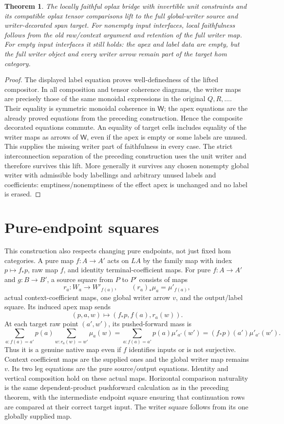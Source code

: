 \documentclass[11pt]{article}
\newtheorem{theorem}{Theorem}\newtheorem{proposition}[theorem]{Proposition}
\begin{document}
\begin{theorem}
The locally faithful oplax bridge with invertible unit constraints and its compatible oplax tensor comparisons lift to the full global-writer source and writer-decorated span target. For nonempty input interfaces, local faithfulness follows from the old raw/context argument and retention of the full writer map. For empty input interfaces it still holds: the apex and label data are empty, but the full writer object and every writer arrow remain part of the target hom category.
\end{theorem}
\begin{proof}
The displayed label equation proves well-definedness of the lifted compositor. In all composition and tensor coherence diagrams, the writer maps are precisely those of the same monoidal expressions in the original $Q,R,\ldots$. Their equality is symmetric monoidal coherence in $\mathsf W$; the apex equations are the already proved equations from the preceding construction. Hence the composite decorated equations commute. An equality of target cells includes equality of the writer maps as arrows of $\mathsf W$, even if the apex is empty or some labels are unused. This supplies the missing writer part of faithfulness in every case. The strict interconnection separation of the preceding construction uses the unit writer and therefore survives this lift. More generally it survives any chosen nonempty global writer with admissible body labellings and arbitrary unused labels and coefficients: emptiness/nonemptiness of the effect apex is unchanged and no label is erased.
\end{proof}

\section{Pure-endpoint squares}
This construction also respects changing pure endpoints, not just fixed hom categories. A pure map $f:A\to A'$ acts on $LA$ by the family map with index $p\mapsto f_*p$, raw map $f$, and identity terminal-coefficient maps. For pure $f:A\to A'$ and $g:B\to B'$, a source square from $P$ to $P'$ consists of maps
\[
 r_a:W_a\to W'_{f(a)},\qquad (r_a)_*\mu_a=\mu'_{f(a)},
\]
actual context-coefficient maps, one global writer arrow $v$, and the output/label square. Its induced apex map sends
\[
 (p,a,w)\longmapsto(f_*p,f(a),r_a(w)).
\]
At each target raw point $(a',w')$, its pushed-forward mass is
\[
 \sum_{a:f(a)=a'}p(a)\sum_{w:r_a(w)=w'}\mu_a(w)
 =\sum_{a:f(a)=a'}p(a)\mu'_{a'}(w')
 =(f_*p)(a')\mu'_{a'}(w').
\]
Thus it is a genuine native map even if $f$ identifies inputs or is not surjective. Context coefficient maps are the supplied ones and the global writer map remains $v$. Its two leg equations are the pure source/output equations. Identity and vertical composition hold on these actual maps. Horizontal comparison naturality is the same dependent-product pushforward calculation as in the preceding theorem, with the intermediate endpoint square ensuring that continuation rows are compared at their correct target input. The writer square follows from its one globally supplied map.
\end{document}
